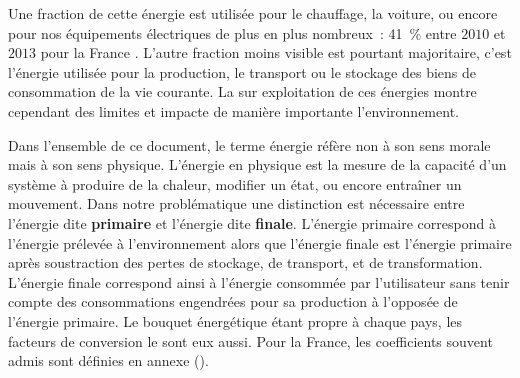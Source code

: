 Une fraction de cette énergie est utilisée pour le chauffage, la voiture, ou encore pour
nos équipements électriques de plus en plus nombreux~: \SI{+41}{\percent}
entre $2010$ et $2013$ pour la France \textcite{ADEME2015}. L’autre fraction moins visible est
pourtant majoritaire, c’est l’énergie utilisée pour la production, le transport ou le
stockage des biens de consommation de la vie courante.
La sur exploitation de ces énergies montre cependant des limites et impacte de manière
importante l’environnement.

\begin{Def}[Énergie]\label{def:energie}
Dans l’ensemble de ce document, le terme énergie réfère non à son sens morale mais à son
sens physique. L’énergie en physique est la mesure de la capacité d’un système à produire
de la chaleur, modifier un état, ou encore entraîner un mouvement. Dans notre
problématique une distinction est nécessaire entre l’énergie dite \textbf{primaire} et
l’énergie dite \textbf{finale}. L’énergie primaire correspond à l’énergie prélevée à
l’environnement alors que l’énergie finale est l’énergie primaire après soustraction des
pertes de stockage, de transport, et de transformation. L’énergie finale correspond ainsi
à l’énergie consommée par l’utilisateur sans tenir compte des consommations engendrées pour sa
production à l’opposée de l’énergie primaire. Le bouquet énergétique étant propre à chaque
pays, les facteurs de conversion le sont eux aussi. Pour la France,
les coefficients souvent admis sont définies en annexe ().
\end{Def}

